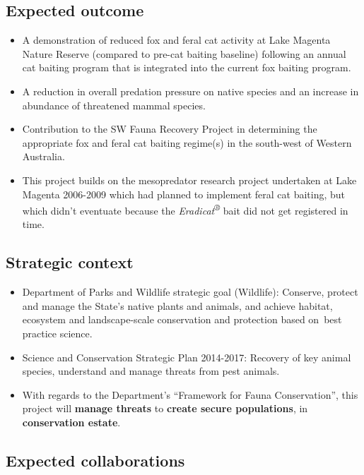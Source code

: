\documentclass[version=last,
    paper=a4, %
    10pt, %
    usenames,
    dvipsnames,
    oneside, %
    headings=openany, %
    DIV=15 %
]{scrbook}
\begin{document}
\subsection*{Expected outcome}

\begin{itemize}
\itemsep1pt\parskip0pt
\item
  A demonstration of reduced fox and feral cat activity at Lake Magenta
  Nature Reserve (compared to pre-cat baiting baseline) following an
  annual cat baiting program that is integrated into the current fox
  baiting program.
\item
  A reduction in overall predation pressure on native species and an
  increase in abundance of threatened mammal species.
\item
  Contribution to the SW Fauna Recovery Project in determining the
  appropriate fox and feral cat baiting regime(s) in the south-west of
  Western Australia.
\item
  This project builds on the mesopredator research project undertaken at
  Lake Magenta 2006-2009 which had planned to implement feral cat
  baiting, but which didn't eventuate because the
  \emph{Eradicat\textsuperscript{®}} bait did not get registered in
  time.
\end{itemize}




\subsection*{Strategic context}

\begin{itemize}
\itemsep1pt\parskip0pt
\item
  Department of Parks and Wildlife strategic goal (Wildlife): Conserve,
  protect and manage the State's native plants and animals, and achieve
  habitat, ecosystem and landscape-scale conservation and protection
  based on~best practice science.
\item
  Science and Conservation Strategic Plan 2014-2017: Recovery of key
  animal species, understand and manage threats from pest animals.
\item
  With regards to the Department's ``Framework for Fauna Conservation'',
  this project will \textbf{manage threats} to \textbf{create secure
  populations}, in \textbf{conservation estate}.
\end{itemize}




\subsection*{Expected collaborations}
\end{document}
